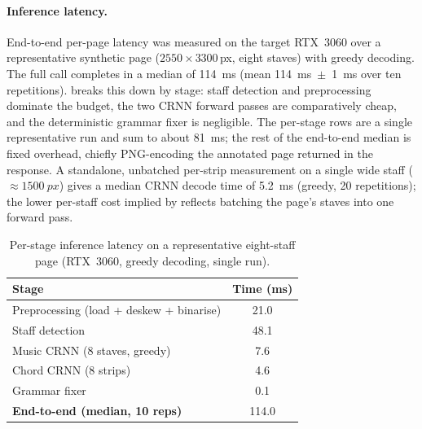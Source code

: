\paragraph{Inference latency.}
End-to-end per-page latency was measured on the target RTX~3060 over a
representative synthetic page ($2550\times3300$\,px, eight staves) with
greedy decoding.
The full  call completes in a median of
\SI{114}{\milli\second} (mean \SI{114}{\milli\second}~$\pm$~\SI{1}{\milli\second}
over ten repetitions).
 breaks this down by stage: staff detection and
preprocessing dominate the budget, the two CRNN forward passes are
comparatively cheap, and the deterministic grammar fixer is
negligible.
The per-stage rows are a single representative run and sum to about
\SI{81}{\milli\second}; the rest of the end-to-end median is fixed
 overhead, chiefly PNG-encoding the annotated page
returned in the response.
A standalone, unbatched per-strip measurement on a single wide staff
($\approx\SI{1500}{px}$) gives a median CRNN decode time of
\SI{5.2}{\milli\second} (greedy, 20 repetitions); the lower per-staff
cost implied by  reflects batching the page's staves
into one forward pass.

\begin{table}[ht]
    \centering
    \caption{Per-stage inference latency on a representative
    eight-staff page (RTX~3060, greedy decoding, single run).}
    \label{tab:latency}
    \small
    \setlength{\tabcolsep}{8pt}
    \renewcommand{\arraystretch}{1.25}
    \begin{tabular}{@{} l S[table-format=3.1] @{}}
        \toprule
        \textbf{Stage} & {\textbf{Time (ms)}} \\
        \midrule
        Preprocessing (load + deskew + binarise) & 21.0 \\
        Staff detection                          & 48.1 \\
        Music CRNN (8 staves, greedy)            &  7.6 \\
        Chord CRNN (8 strips)                    &  4.6 \\
        Grammar fixer                            &  0.1 \\
        \midrule
        \textbf{End-to-end (median, 10 reps)}    & 114.0 \\
        \bottomrule
    \end{tabular}
\end{table}

